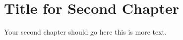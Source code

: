 \chapter{Title for Second Chapter}
\label{chapter:chapter02}

Your second chapter should go here \cite{greenwade93} this is more text.

